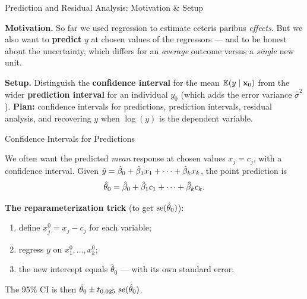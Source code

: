 \documentclass[aspectratio=169, 12pt]{beamer}
\begin{document}
\begin{frame}{Prediction and Residual Analysis: Motivation \& Setup}

  \begin{highlightbox}
    \textbf{Motivation.} So far we used regression to estimate ceteris paribus
    \emph{effects}. But we also want to \textbf{predict} $y$ at chosen values of the
    regressors --- and to be honest about the uncertainty, which differs for an
    \emph{average} outcome versus a \emph{single} new unit.
  \end{highlightbox}

  \begin{keybox}
    \textbf{Setup.} Distinguish the \textbf{confidence interval} for the mean
    $\operatorname{\mathbb{E}}(y\mid\mathbf{x}_0)$ from the wider \textbf{prediction interval} for an individual
    $y_0$ (which adds the error variance $\hat\sigma^2$). \textbf{Plan:} confidence
    intervals for predictions, prediction intervals, residual analysis, and recovering
    $y$ when $\log(y)$ is the dependent variable.
  \end{keybox}

\end{frame}

\begin{frame}{Confidence Intervals for Predictions}

  We often want the predicted \emph{mean} response at chosen values $x_j = c_j$, with a
  confidence interval. Given $\hat{y} = \hat{\beta}_0 + \hat{\beta}_1 x_1 + \cdots + \hat{\beta}_k x_k$, the
  point prediction is
  \[
    \hat\theta_0 = \hat{\beta}_0 + \hat{\beta}_1 c_1 + \cdots + \hat{\beta}_k c_k .
  \]

  \medskip

  \textbf{The reparameterization trick} (to get $\operatorname{se}(\hat\theta_0)$):
  \begin{enumerate}
    \item define $x_j^0 = x_j - c_j$ for each variable;
    \item regress $y$ on $x_1^0, \ldots, x_k^0$;
    \item the new intercept equals $\hat\theta_0$ --- with its own standard error.
  \end{enumerate}
  The 95\% CI is then $\hat\theta_0 \pm t_{0.025}\,\operatorname{se}(\hat\theta_0)$.

\end{frame}
\end{document}
